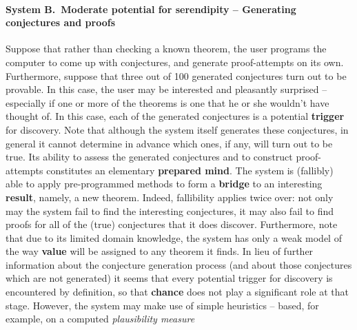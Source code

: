 \paragraph{System B.~Moderate potential for serendipity -- Generating conjectures and proofs} 
Suppose that rather than checking a known theorem, the user programs
the computer to come up with conjectures, and generate proof-attempts on
its own.  Furthermore, suppose that three out of 100 generated
conjectures turn out to be provable.  In this case, the user may be
interested and pleasantly surprised -- especially if one or more of
the theorems is one that he or she wouldn't have thought of.  In this
case, each of the generated conjectures is a potential
\textbf{trigger} for discovery.  Note that although the system itself
generates these conjectures, in general it cannot determine in advance which ones,
if any, will turn out to be true.  Its ability to assess the generated
conjectures and to construct proof-attempts constitutes an elementary
\textbf{prepared mind}.  The system is (fallibly) able to apply
pre-programmed methods to form a \textbf{bridge} to an interesting
\textbf{result}, namely, a new theorem.  Indeed, fallibility applies
twice over: not only may the system fail to find the interesting
conjectures, it may also fail to find proofs for all of the (true)
conjectures that it does discover.
Furthermore, note that due to its limited domain knowledge, the system
has only a weak model of the way \textbf{value} will be assigned to
any theorem it finds.
In lieu of further information about the conjecture generation process
(and about those conjectures which are not generated)
it seems that every potential trigger for discovery is
encountered by definition, so that \textbf{chance} does
not play a significant role at that stage.
However, the system may make use of simple heuristics -- based, for example, on
a computed \emph{plausibility measure}

